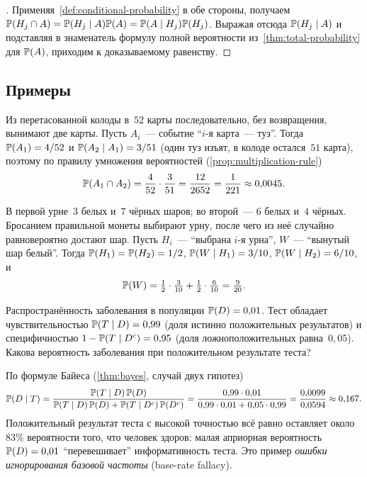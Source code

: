 \begin{proof}[]
Применяя~\cref{def:conditional-probability} в обе стороны, получаем $\mathbb{P}(H_j \cap A) = \mathbb{P}(H_j \mid A) \mathbb{P}(A) = \mathbb{P}(A \mid H_j) \mathbb{P}(H_j)$. Выражая отсюда $\mathbb{P}(H_j \mid A)$ и подставляя в знаменатель формулу полной вероятности из~\cref{thm:total-probability} для $\mathbb{P}(A)$, приходим к доказываемому равенству.
\end{proof}

\subsection*{Примеры}

\begin{example}
\label{ex:two-cards}
Из перетасованной колоды в~$52$ карты последовательно, без возвращения, вынимают две карты. Пусть $A_i$~--- событие ``$i$-я карта~--- туз''. Тогда $\mathbb{P}(A_1) = 4/52$ и $\mathbb{P}(A_2 \mid A_1) = 3/51$ (один туз изъят, в колоде остался~$51$ карта), поэтому по правилу умножения вероятностей (\cref{prop:multiplication-rule})
\[
  \mathbb{P}(A_1 \cap A_2) = \frac{4}{52} \cdot \frac{3}{51} = \frac{12}{2652} = \frac{1}{221} \approx 0{,}0045.
\]
\end{example}

\begin{example}
\label{ex:two-urns}
В первой урне~$3$ белых и~$7$ чёрных шаров; во второй~--- $6$ белых и~$4$ чёрных. Бросанием правильной монеты выбирают урну, после чего из неё случайно равновероятно достают шар. Пусть $H_i$~--- ``выбрана $i$-я урна'', $W$~--- ``вынутый шар белый''. Тогда $\mathbb{P}(H_1) = \mathbb{P}(H_2) = 1/2$, $\mathbb{P}(W \mid H_1) = 3/10$, $\mathbb{P}(W \mid H_2) = 6/10$, и
\[
  \mathbb{P}(W) = \tfrac{1}{2} \cdot \tfrac{3}{10} + \tfrac{1}{2} \cdot \tfrac{6}{10} = \tfrac{9}{20}.
\]
\end{example}

\begin{example}
\label{ex:medical-test}
Распространённость заболевания в популяции $\mathbb{P}(D) = 0{,}01$. Тест обладает чувствительностью $\mathbb{P}(T \mid D) = 0{,}99$ (доля истинно положительных результатов) и специфичностью $1 - \mathbb{P}(T \mid D^c) = 0{,}95$ (доля ложноположительных равна~$0{,}05$). Какова вероятность заболевания при положительном результате теста?

По формуле Байеса (\cref{thm:bayes}, случай двух гипотез)
\[
  \mathbb{P}(D \mid T) = \frac{\mathbb{P}(T \mid D)\, \mathbb{P}(D)}{\mathbb{P}(T \mid D)\, \mathbb{P}(D) + \mathbb{P}(T \mid D^c)\, \mathbb{P}(D^c)}
  = \frac{0{,}99 \cdot 0{,}01}{0{,}99 \cdot 0{,}01 + 0{,}05 \cdot 0{,}99}
  = \frac{0{,}0099}{0{,}0594} \approx 0{,}167.
\]
Положительный результат теста с высокой точностью всё равно оставляет около~$83\%$ вероятности того, что человек здоров: малая априорная вероятность $\mathbb{P}(D) = 0{,}01$ ``перевешивает'' информативность теста. Это пример \emph{ошибки игнорирования базовой частоты} (base-rate fallacy).
\end{example}


